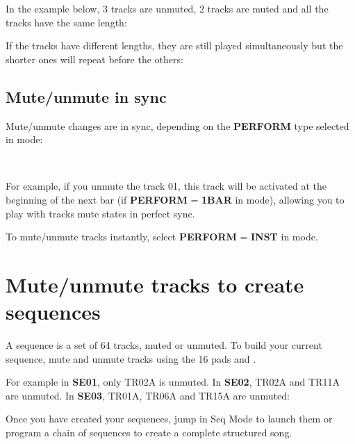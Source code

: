 In the example below, 3 tracks are unmuted, 2 tracks are muted and all the tracks have the same length:


If the tracks have different lengths, they are still played simultaneously but the shorter ones will repeat before the others:



\subsection{Mute/unmute in sync}

Mute/unmute changes are in sync, depending on the \textbf{PERFORM} type selected in  mode:

\\

For example, if you unmute the track 01, this track will be activated at the beginning of the next bar (if \textbf{PERFORM} = \textbf{1BAR} in  mode), allowing you to play with tracks mute states in perfect sync.

To mute/unmute tracks instantly, select \textbf{PERFORM} = \textbf{INST} in  mode.



\section{Mute/unmute tracks to create sequences}

A sequence is a set of 64 tracks, muted or unmuted. To build your current sequence, mute and unmute tracks using the 16 pads \stepbystepicon{} and \btn{<} \btn{>}.

For example in \textbf{SE01}, only TR02A is unmuted. In \textbf{SE02}, TR02A and TR11A are unmuted. In \textbf{SE03}, TR01A, TR06A and TR15A are unmuted:


Once you have created your sequences, jump in Seq Mode to launch them or program a chain of sequences to create a complete structured song.

